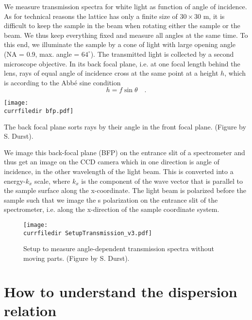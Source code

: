 We measure transmission spectra for white light as function of angle of incidence. As for technical reasons the lattice has only a finite size of $30 \times 30$ \textmu m, it is difficult to keep the sample in the beam when rotating either the sample or the beam. We thus keep everything fixed and measure all angles at the same time. To this end, we illuminate the sample by a cone of light with large opening angle (NA = 0.9, max. angle = $64^\circ$). The transmitted light is collected by a second microscope objective. In its back focal plane, i.e. at one focal length behind the lens, rays of equal angle of incidence cross at the same point at a height $h$, which is according to the Abbé sine condition
\begin{equation}
 h = f \sin \theta \quad .
\end{equation}

\begin{marginfigure}
\texttt{[image: \\currfiledir bfp.pdf]}
\caption{The back focal plane sorts rays by their angle in the front focal plane.  (Figure by S. Durst).}
\end{marginfigure}

We image this back-focal plane (BFP) on the entrance slit of a spectrometer and thus get an image on the CCD camera which in one direction is angle of incidence, in the other wavelength of the light beam. This is converted into a energy-$k_x$ scale, where $k_x$ is the component of the wave vector that is parallel to the sample surface along the x-coordinate. The light beam is polarized before the sample such that we image the s polarization on the entrance slit of the spectrometer, i.e. along the x-direction of the sample coordinate system.


\begin{figure}
\texttt{[image: \\currfiledir SetupTransmission\_v3.pdf]}
\caption{Setup to measure angle-dependent transmission spectra without moving parts.  (Figure by S. Durst). }
\end{figure}


\section{How to understand the dispersion relation}

